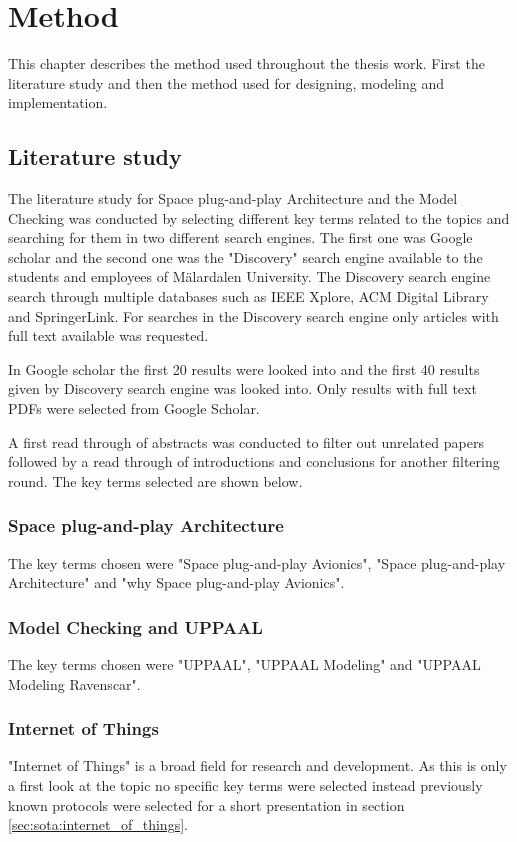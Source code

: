 \chapter{Method}\label{ch:method}
This chapter describes the method used throughout the thesis work. First
the literature study and then the method used for designing, modeling and
implementation.

\section{Literature study}
The literature study for Space plug-and-play Architecture and the Model
Checking was conducted by selecting different key terms related to the topics
and searching for them in two different search engines. The first one was
Google scholar and the second one was the "Discovery" search engine available
to the students and employees of M\"{a}lardalen University. The Discovery
search engine search through multiple databases such as IEEE Xplore, ACM
Digital Library and SpringerLink. For searches in the Discovery search engine
only articles with full text available was requested.

In Google scholar the first 20 results were looked into and the first 40
results given by Discovery search engine was looked into. Only results with
full text PDFs were selected from Google Scholar.

A first read through of abstracts was conducted to filter out unrelated
papers followed by a read through of introductions and conclusions for
another filtering round. The key terms selected are shown below.

\subsection{Space plug-and-play Architecture}
The key terms chosen were "Space plug-and-play Avionics", "Space
plug-and-play Architecture" and "why Space plug-and-play Avionics".

\subsection{Model Checking and UPPAAL}
The key terms chosen were "UPPAAL", "UPPAAL Modeling" and "UPPAAL Modeling
Ravenscar".

\subsection{Internet of Things}
"Internet of Things" is a broad field for research and development. As this is
only a first look at the topic no specific key terms were selected instead
previously known protocols were selected for a short presentation in section
\ref{sec:sota:internet_of_things}.

